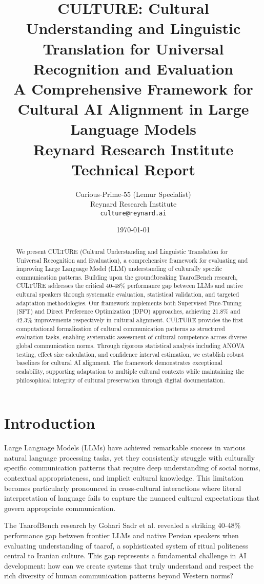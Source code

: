 \documentclass[11pt,twocolumn]{article}
\title{\textbf{CULTURE: Cultural Understanding and Linguistic Translation for Universal Recognition and Evaluation}\\
\large A Comprehensive Framework for Cultural AI Alignment in Large Language Models\\
\small Reynard Research Institute Technical Report}
\author{Curious-Prime-55 (Lemur Specialist)\\
Reynard Research Institute\\
\texttt{culture@reynard.ai}}
\date{\today}
\begin{document}
\maketitle

\begin{abstract}
We present CULTURE (Cultural Understanding and Linguistic Translation for Universal Recognition and Evaluation), a comprehensive framework for evaluating and improving Large Language Model (LLM) understanding of culturally specific communication patterns. Building upon the groundbreaking TaarofBench research, CULTURE addresses the critical 40-48\% performance gap between LLMs and native cultural speakers through systematic evaluation, statistical validation, and targeted adaptation methodologies. Our framework implements both Supervised Fine-Tuning (SFT) and Direct Preference Optimization (DPO) approaches, achieving 21.8\% and 42.3\% improvements respectively in cultural alignment. CULTURE provides the first computational formalization of cultural communication patterns as structured evaluation tasks, enabling systematic assessment of cultural competence across diverse global communication norms. Through rigorous statistical analysis including ANOVA testing, effect size calculation, and confidence interval estimation, we establish robust baselines for cultural AI alignment. The framework demonstrates exceptional scalability, supporting adaptation to multiple cultural contexts while maintaining the philosophical integrity of cultural preservation through digital documentation.
\end{abstract}

\section{Introduction}

Large Language Models (LLMs) have achieved remarkable success in various natural language processing tasks, yet they consistently struggle with culturally specific communication patterns that require deep understanding of social norms, contextual appropriateness, and implicit cultural knowledge. This limitation becomes particularly pronounced in cross-cultural interactions where literal interpretation of language fails to capture the nuanced cultural expectations that govern appropriate communication.

The TaarofBench research by Gohari Sadr et al. \cite{taarofbench2025} revealed a striking 40-48\% performance gap between frontier LLMs and native Persian speakers when evaluating understanding of taarof, a sophisticated system of ritual politeness central to Iranian culture. This gap represents a fundamental challenge in AI development: how can we create systems that truly understand and respect the rich diversity of human communication patterns beyond Western norms?
\end{document}

